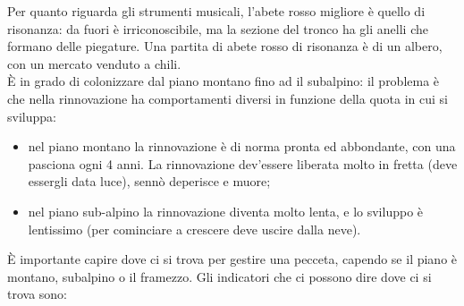 Per quanto riguarda gli strumenti musicali, l'abete rosso migliore è quello di risonanza: da fuori è irriconoscibile, ma la sezione del tronco ha gli anelli che formano delle piegature. Una partita di abete rosso di risonanza è di un albero, con un mercato venduto a chili.\\
È in grado di colonizzare dal piano montano fino ad il subalpino: il problema è che nella rinnovazione ha comportamenti diversi in funzione della quota in cui si sviluppa:
\begin{itemize}[nosep]
    \item nel piano montano la rinnovazione è di norma pronta ed abbondante, con una pasciona ogni 4 anni. La rinnovazione dev'essere liberata molto in fretta (deve essergli data luce), sennò deperisce e muore;
    \item nel piano sub-alpino la rinnovazione diventa molto lenta, e lo sviluppo è lentissimo (per cominciare a crescere deve uscire dalla neve).
\end{itemize}
È importante capire dove ci si trova per gestire una pecceta, capendo se il piano è montano, subalpino o il framezzo. Gli indicatori che ci possono dire dove ci si trova sono:

